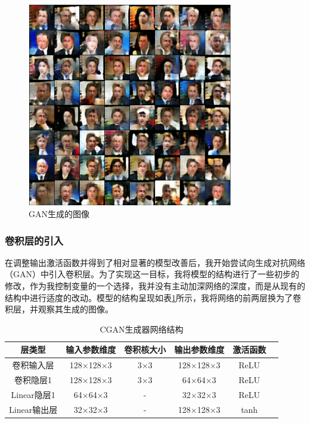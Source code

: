 \documentclass[UTF8]{ctexart}
\begin{document}
\begin{figure}[H]
\centering
\includegraphics[width=0.8\textwidth]{./images/GAN_tanh.png}
\caption{GAN生成的图像}
\label{fig:GAN_tanh}
\end{figure}
\subsubsection{卷积层的引入}
在调整输出激活函数并得到了相对显著的模型改善后，我开始尝试向生成对抗网络（GAN）中引入卷积层。为了实现这一目标，我将模型的结构进行了一些初步的修改，作为我控制变量的一个选择，我并没有主动加深网络的深度，而是从现有的结构中进行适度的改动。模型的结构呈现如表\ref{tab:gen_cgan}所示，我将网络的前两层换为了卷积层，并观察其生成的图像。
\begin{table}[htbp]
\centering
\caption{CGAN生成器网络结构}
\label{tab:gen_cgan}
\begin{tabular}{cccccc}
\toprule[1.5pt]
\textbf{层类型} & \textbf{输入参数维度} & \textbf{卷积核大小} & \textbf{输出参数维度} & \textbf{激活函数} \\
\midrule[1.5pt]
卷积输入层 & 128$\times$128$\times$3 & 3$\times$3 & 128$\times$128$\times$3 & ReLU \\
卷积隐层1 & 128$\times$128$\times$3 & 3$\times$3 & 64$\times$64$\times$3 & ReLU \\
Linear隐层1 & 64$\times$64$\times$3 & - & 32$\times$32$\times$3 & ReLU \\
Linear输出层 & 32$\times$32$\times$3 & - & 128$\times$128$\times$3 & tanh \\
\bottomrule[1.0pt]
\end{tabular}
\end{table}
\end{document}
